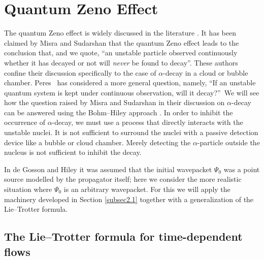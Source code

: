 \documentclass[12pt]{article}%
\begin{document}
\section{Quantum Zeno Effect\label{sec3}}

The quantum Zeno effect is widely discussed in the literature
\cite{ebpb91,widhjbdw,ej84,kk81}. It has been claimed by Misra and Sudarshan
\cite{bmes77, ccesbm77} that the quantum Zeno effect leads to the conclusion
that, and we quote, \textquotedblleft an unstable particle observed
continuously whether it has decayed or not will \emph{never} be found to
decay\textquotedblright. These authors confine their discussion specifically
to the case of $\alpha$-decay in a cloud or bubble chamber. Peres~\cite{ap80}
has considered a more general question, namely, \textquotedblleft If an
unstable quantum system is kept under continuous observation, will it
decay?\textquotedblright\ We will see how the question raised by Misra and
Sudarshan \cite{bmes77} in their discussion on $\alpha$-decay can be answered
using the Bohm--Hiley approach \cite{BoHi}. In order to inhibit the occurrence
of $\alpha$-decay, we must use a process that directly interacts with the
unstable nuclei. It is not sufficient to surround the nuclei with a passive
detection device like a bubble or cloud chamber. Merely detecting the $\alpha
$-particle outside the nucleus is not sufficient to inhibit the decay.

In de Gosson and Hiley \cite{gohi2,gohi3} it was assumed that the initial
wavepacket $\Psi_{0}$ was a point source modelled by the propagator itself;
here we consider the more realistic situation where $\Psi_{0}$ is an arbitrary
wavepacket. For this we will apply the machinery developed in Section
\ref{subsec2.1} together with a generalization of the Lie--Trotter formula.

\subsection{The Lie--Trotter formula for time-dependent flows}
\end{document}
